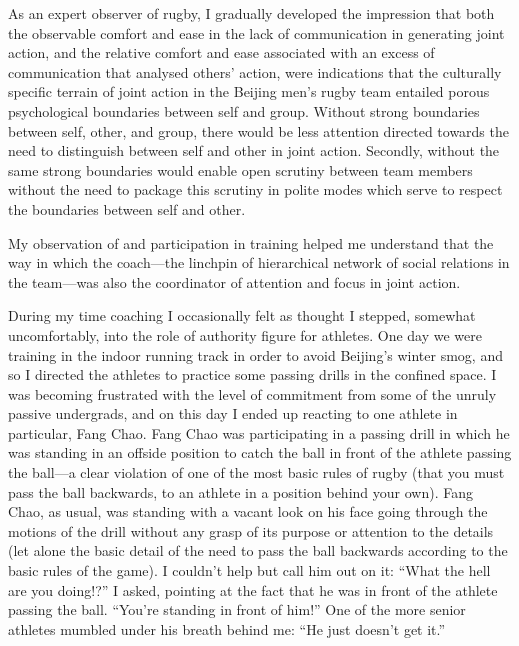   As an expert observer of rugby, I gradually developed the impression that both the observable comfort and ease in the lack of communication in generating joint action, and the relative comfort and ease associated with an excess of communication that analysed others' action, were indications that the culturally specific terrain of joint action in the Beijing men's rugby team entailed porous psychological boundaries between self and group.  Without strong boundaries between self, other, and group, there would be less attention directed towards the need to distinguish between self and other in joint action.  Secondly, without the same strong boundaries would enable open scrutiny between team members without the need to package this scrutiny in polite modes which serve to respect the boundaries between self and other.



  My observation of and participation in training helped me understand that the way in which the coach---the linchpin of hierarchical network of social relations in the team---was also the coordinator of attention and focus in joint action.

  During my time coaching I occasionally felt as thought I stepped, somewhat uncomfortably, into the role of authority figure for athletes.  One day we were training in the indoor running track in order to avoid Beijing's winter smog, and so I directed the athletes to practice some passing drills in the confined space.  I was becoming frustrated with the level of commitment from some of the unruly passive undergrads, and on this day I ended up reacting to one athlete in particular, Fang Chao.  Fang Chao was participating in a passing drill in which he was standing in an offside position to catch the ball in front of the athlete passing the ball---a clear violation of one of the most basic rules of rugby (that you must pass the ball backwards, to an athlete in a position behind your own).  Fang Chao, as usual, was standing with a vacant look on his face going through the motions of the drill without any grasp of its purpose or attention to the details (let alone the basic detail of the need to pass the ball backwards according to the basic rules of the game).  I couldn't help but call him out on it: ``What the hell are you doing!?'' I asked, pointing at the fact that he was in front of the athlete passing the ball.  ``You're standing in front of him!'' One of the more senior athletes mumbled under his breath behind me: ``He just doesn't get it.''

